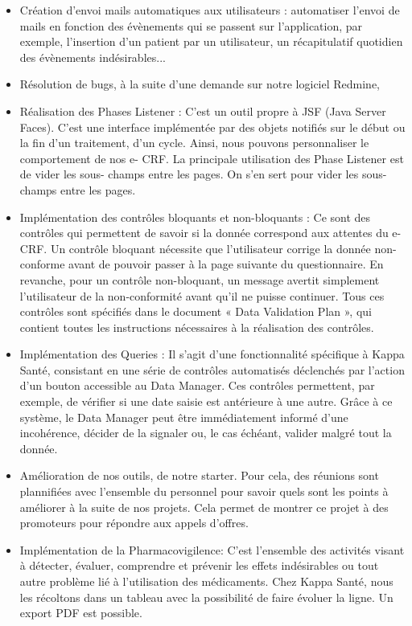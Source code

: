 \begin{itemize}
    \item Création d’envoi mails automatiques aux utilisateurs : automatiser l’envoi
    de mails en fonction des évènements qui se passent sur l’application, par
    exemple, l’insertion d’un
    patient par un utilisateur, un récapitulatif quotidien des évènements
    indésirables...
    \item Résolution de bugs, à la suite d’une demande sur notre logiciel Redmine,
    \item Réalisation des Phases Listener : C’est un outil propre à JSF (Java Server
    Faces). C’est une interface implémentée par des objets notifiés sur le début
    ou la fin d’un traitement,
    d’un cycle. Ainsi, nous pouvons personnaliser le comportement de nos e-
    CRF. La principale utilisation des Phase Listener est de vider les sous-
    champs entre les pages. On s’en sert pour vider les sous-champs entre les
    pages.
    \item Implémentation des contrôles bloquants et non-bloquants : Ce sont des
    contrôles qui permettent de savoir si la donnée correspond aux attentes du
    e-CRF. Un contrôle bloquant nécessite que l’utilisateur corrige la donnée non-conforme avant
    de pouvoir passer à la page suivante du questionnaire. En revanche, pour
    un contrôle non-bloquant, un message avertit simplement l’utilisateur de la
    non-conformité avant qu’il ne puisse continuer. Tous ces contrôles sont spécifiés dans le document « Data Validation Plan », qui contient toutes les
    instructions nécessaires à la réalisation des contrôles.
    \item Implémentation des Queries : Il s’agit d’une fonctionnalité spécifique à Kappa Santé, consistant en une série de contrôles automatisés déclenchés par l’action d’un bouton accessible au Data Manager. Ces contrôles permettent, par exemple, de vérifier si une date saisie est antérieure à une autre. Grâce à ce système, le Data Manager peut être immédiatement informé d’une incohérence, décider de la signaler ou, le cas échéant, valider malgré tout la donnée.
    \item Amélioration de nos outils, de notre starter. Pour cela, des réunions sont plannifiées avec l'ensemble du personnel pour savoir quels sont les points à améliorer à la suite de nos projets. Cela permet de montrer ce projet à des promoteurs pour répondre aux appels d'offres.
    \item Implémentation de la Pharmacovigilence: C'est l’ensemble des activités visant à détecter, évaluer, comprendre et prévenir les effets indésirables ou tout autre problème lié à l’utilisation des médicaments. Chez Kappa Santé, nous les récoltons dans un tableau avec la possibilité de faire évoluer la ligne. Un export PDF est possible.
\end{itemize}
